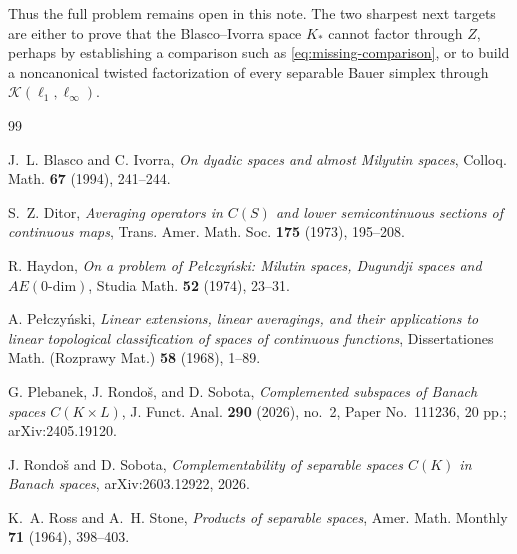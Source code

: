 \documentclass[11pt]{article}
\theoremstyle{definition}
\theoremstyle{remark}
\newcommand{\C}{C}
\newcommand{\Kop}{\mathcal K}
\begin{document}
Thus the full problem remains open in this note.  The two sharpest next
targets are either to prove that the Blasco--Ivorra space $K_*$ cannot
factor through $Z$, perhaps by establishing a comparison such as
\eqref{eq:missing-comparison}, or to build a noncanonical twisted
factorization of every separable Bauer simplex through
$\Kop(\ell_1,\ell_\infty)$.

\begin{thebibliography}{99}

J.~L. Blasco and C. Ivorra,
\emph{On dyadic spaces and almost Milyutin spaces},
Colloq. Math. \textbf{67} (1994), 241--244.

S.~Z. Ditor,
\emph{Averaging operators in $\C(S)$ and lower semicontinuous sections of
continuous maps},
Trans. Amer. Math. Soc. \textbf{175} (1973), 195--208.

R. Haydon,
\emph{On a problem of Pe\l czy\'nski: Milutin spaces, Dugundji spaces and
$AE(0\text{-dim})$},
Studia Math. \textbf{52} (1974), 23--31.

A. Pe\l czy\'nski,
\emph{Linear extensions, linear averagings, and their applications to
linear topological classification of spaces of continuous functions},
Dissertationes Math. (Rozprawy Mat.) \textbf{58} (1968), 1--89.

G. Plebanek, J. Rondo\v{s}, and D. Sobota,
\emph{Complemented subspaces of Banach spaces $\C(K\times L)$},
J. Funct. Anal. \textbf{290} (2026), no.~2, Paper No.~111236, 20 pp.;
arXiv:2405.19120.

J. Rondo\v{s} and D. Sobota,
\emph{Complementability of separable spaces $\C(K)$ in Banach spaces},
arXiv:2603.12922, 2026.

K.~A. Ross and A.~H. Stone,
\emph{Products of separable spaces},
Amer. Math. Monthly \textbf{71} (1964), 398--403.

\end{thebibliography}
\end{document}
